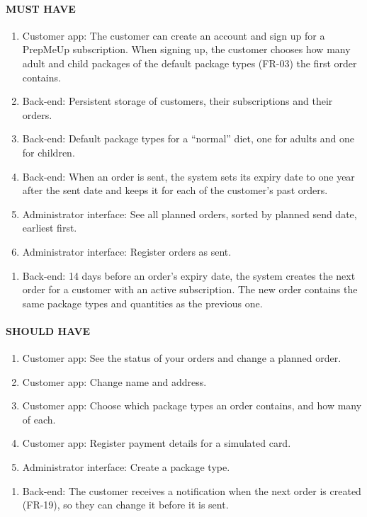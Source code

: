 \documentclass[a4paper,11pt]{article}
\begin{document}
\paragraph{MUST HAVE}
\begin{enumerate}[label=\reqlabel{FR}, start=1]
    \item Customer app: The customer can create an account and sign up for a PrepMeUp subscription. When signing up, the customer chooses how many adult and child packages of the default package types (FR-03) the first order contains.
    \item Back-end: Persistent storage of customers, their subscriptions and their orders.
    \item Back-end: Default package types for a ``normal'' diet, one for adults and one for children.
    \item Back-end: When an order is sent, the system sets its expiry date to one year after the sent date and keeps it for each of the customer's past orders.
    \item Administrator interface: See all planned orders, sorted by planned send date, earliest first.
    \item Administrator interface: Register orders as sent.
\end{enumerate}
\begin{enumerate}[label=\reqlabel{FR}, start=19]
    \item Back-end: 14 days before an order's expiry date, the system creates the next order for a customer with an active subscription. The new order contains the same package types and quantities as the previous one.
\end{enumerate}
\paragraph{SHOULD HAVE}
\begin{enumerate}[label=\reqlabel{FR}, start=7]
    \item Customer app: See the status of your orders and change a planned order.
    \item Customer app: Change name and address.
    \item Customer app: Choose which package types an order contains, and how many of each.
    \item Customer app: Register payment details for a simulated card.
    \item Administrator interface: Create a package type.
\end{enumerate}
\begin{enumerate}[label=\reqlabel{FR}, start=20]
    \item Back-end: The customer receives a notification when the next order is created (FR-19), so they can change it before it is sent.
\end{enumerate}
\end{document}
